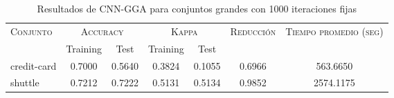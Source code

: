 \begin{table}[]
\centering
\begin{tabular}{l c c c c c c}
\hline
\multirow{2}{*}{\textsc{Conjunto}}
	& \multicolumn{2}{c}{\textsc{Accuracy}}
	& \multicolumn{2}{c}{\textsc{Kappa}}
	& \textsc{Reducción}
	& \textsc{Tiempo promedio (seg)} \\
	& Training & Test
	& Training & Test \\ 
\hline
\hline

credit-card & 0.7000 & 0.5640 & 0.3824 & 0.1055 & 0.6966 & 563.6650 \\
shuttle & 0.7212 & 0.7222 & 0.5131 & 0.5134 & 0.9852 & 2574.1175 \\

\hline
\end{tabular}
\caption{Resultados de CNN-GGA para conjuntos grandes con 1000 iteraciones fijas}
\label{res-grande-cnn-gga}
\end{table}

